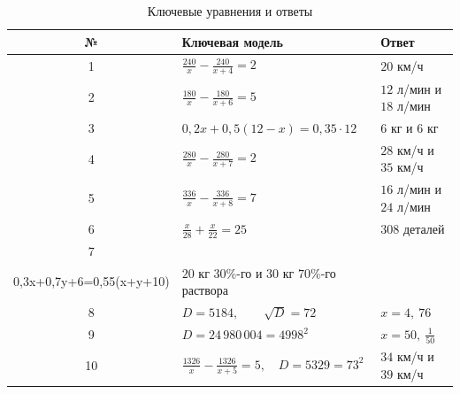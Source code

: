 \documentclass[a4paper,12pt]{article}
\begin{document}
\begin{table}[ht]
\centering
\caption{Ключевые уравнения и ответы}
\small
\begin{tabularx}{\linewidth}{@{}c X >{\raggedright\arraybackslash}p{4.2cm}@{}}
\toprule
\textbf{№}
&
\textbf{Ключевая модель}
&
\textbf{Ответ}
\\
\midrule

1
&
\(\displaystyle
\frac{240}{x}-\frac{240}{x+4}=2
\)
&
\(20\) км/ч
\\[3mm]

2
&
\(\displaystyle
\frac{180}{x}-\frac{180}{x+6}=5
\)
&
\(12\) л/мин и \(18\) л/мин
\\[3mm]

3
&
\(\displaystyle
0{,}2x+0{,}5(12-x)=0{,}35\cdot12
\)
&
\(6\) кг и \(6\) кг
\\[3mm]

4
&
\(\displaystyle
\frac{280}{x}-\frac{280}{x+7}=2
\)
&
\(28\) км/ч и \(35\) км/ч
\\[3mm]

5
&
\(\displaystyle
\frac{336}{x}-\frac{336}{x+8}=7
\)
&
\(16\) л/мин и \(24\) л/мин
\\[3mm]

6
&
\(\displaystyle
\frac{x}{28}+\frac{x}{22}=25
\)
&
\(308\) деталей
\\[3mm]

7
&
\(\displaystyle
\begin{cases}
0{,}3x+0{,}7y=0{,}45(x+y+10),\\
0{,}3x+0{,}7y+6=0{,}55(x+y+10)
\end{cases}
\)
&
\(20\) кг \(30\%\)-го и \(30\) кг \(70\%\)-го раствора
\\[5mm]

8
&
\(\displaystyle
D=5184,\qquad \sqrt D=72
\)
&
\(x=4,\ 76\)
\\[3mm]

9
&
\(\displaystyle
D=24\,980\,004=4998^2
\)
&
\(\displaystyle x=50,\ \frac1{50}\)
\\[3mm]

10
&
\(\displaystyle
\frac{1326}{x}-\frac{1326}{x+5}=5,
\quad
D=5329=73^2
\)
&
\(34\) км/ч и \(39\) км/ч
\\

\bottomrule
\end{tabularx}
\end{table}
\end{document}
